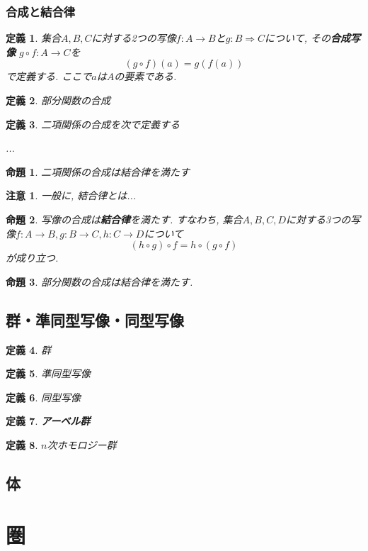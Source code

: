 \documentclass{jsbook}
\theoremstyle{plain}
\newtheorem{Def}{定義}[chapter]
\newtheorem{Prop}{命題}[chapter]
\newtheorem{caution}{注意}[chapter]
\begin{document}
\subsection{合成と結合律}
\begin{Def}
集合$A,B,C$に対する2つの写像$f:A\rightarrow B$と$g:B\Rightarrow C$について, その{\bf 合成写像} $g\circ f:A\rightarrow C$を
\[
(g\circ f)(a)=g(f(a))
\]
で定義する. ここで$a$は$A$の要素である.
\end{Def}
\begin{Def}
部分関数の合成
\end{Def}
\begin{Def}
二項関係の合成を次で定義する

...
\end{Def}
\begin{Prop}
二項関係の合成は結合律を満たす
\end{Prop}
\begin{caution}
一般に, 結合律とは...
\end{caution}
\begin{Prop}
写像の合成は{\bf 結合律}を満たす.
すなわち, 集合$A,B,C,D$に対する3つの写像$f:A\rightarrow B, g:B\rightarrow C,
h:C\rightarrow D$について
\[
(h\circ g)\circ f=h\circ(g\circ f)
\]
が成り立つ.
\end{Prop}
\begin{Prop}
部分関数の合成は結合律を満たす.
\end{Prop}
\section{群・準同型写像・同型写像}
\begin{Def}
群
\end{Def}
\begin{Def}
準同型写像
\end{Def}
\begin{Def}
同型写像
\end{Def}
\begin{Def}
{\bf アーベル群}
\end{Def}
\begin{Def}
$n$次ホモロジー群
\end{Def}
\section{体}
\chapter{圏}
\end{document}
